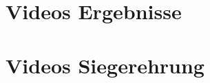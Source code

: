 \documentclass[a4paper, oneside,openany, 12pt, ngerman, listof=nochaptergap, bibliography=totoc,
,listof=totoc,listof=entryprefix,]{scrbook} %
\begin{document}
\setlength{\parindent}{0em} 

\begin{titlepage}

\end{titlepage}


\tableofcontents

\cleardoublepage


\newpage


\mainmatter














\appendix
\chapter{Videos Ergebnisse}
\chapter{Videos Siegerehrung}











%
\end{document}

